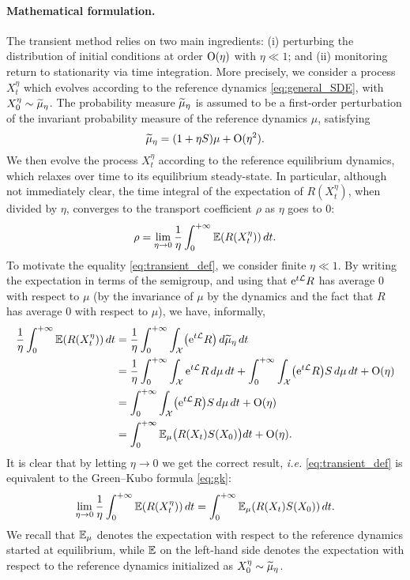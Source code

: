 \paragraph{Mathematical formulation.} The transient method relies on two main ingredients: (i) perturbing the distribution of initial conditions at order $\mathrm{O}(\eta)$ with $\eta\ll 1$; and (ii) monitoring return to stationarity via time integration. More precisely, we consider a process $X_t^\eta$ which evolves according to the reference dynamics \eqref{eq:general_SDE}, with $X_0^\eta \sim \widetilde{\mu}_\eta$. The probability measure $\widetilde{\mu}_\eta$ is assumed to be a first-order perturbation of the invariant probability measure of the reference dynamics $\mu$, satisfying
%
\begin{equation}
	\widetilde{\mu}_\eta = (1+\eta S)\mu + \mathrm{O}(\eta^2).
	\label{eq:init_dist}
\end{equation}
%
We then evolve the process $X_t^\eta$ according to the reference equilibrium dynamics, which relaxes over time to its equilibrium steady-state. In particular, although not immediately clear, the time integral of the expectation of $R(X_t^\eta)$, when divided by $\eta$, converges to the transport coefficient $\rho$ as $\eta$ goes to 0:
%
\begin{equation}
	\rho = \lim_{\eta\to 0} \frac{1}{\eta}\int_0^{+\infty} \mathbb{E}(R(X_t^\eta)) \, dt.
	\label{eq:transient_def}
\end{equation}
%
To motivate the equality \eqref{eq:transient_def}, we consider finite $\eta\ll 1$. By writing the expectation in terms of the semigroup, and using that $\mathrm{e}^{t\mathcal{L}}R$ has average 0 with respect to $\mu$ (by the invariance of $\mu$ by the dynamics and the fact that $R$ has average 0 with respect to $\mu$), we have, informally,
%
%
\begin{align}
    \label{eq:gk_equiv1}
	\frac{1}{\eta}\int_0^{+\infty} \mathbb{E}(R(X_t^\eta)) \, dt &= \frac{1}{\eta} \int_0^{+\infty} \int_\mathcal{X} \bigl(\mathrm{e}^{t\mathcal{L}} R\bigr) \, d\widetilde{\mu}_\eta \, dt \\
	&= \frac{1}{\eta}\int_0^{+\infty} \int_\mathcal{X} \mathrm{e}^{t\mathcal{L}} R \, d\mu \, dt + \int_0^{+\infty} \int_\mathcal{X} \bigl(\mathrm{e}^{t\mathcal{L}} R\bigr) S \, d\mu \, dt + \mathrm{O}(\eta) \\
	&= \int_0^{+\infty} \int_\mathcal{X} \bigl(\mathrm{e}^{t\mathcal{L}} R\bigr) S \, d\mu \, dt + \mathrm{O}(\eta) \\
	&= \int_0^{+\infty} \mathbb{E}_\mu\bigl(R(X_t)S(X_0)\bigr) dt + \mathrm{O}(\eta).
    \label{eq:gk_equiv2}
\end{align}
%
It is clear that by letting $\eta\to 0$ we get the correct result, \emph{i.e.} \eqref{eq:transient_def} is equivalent to the Green--Kubo formula \eqref{eq:gk}:
%
\begin{equation}
	\lim_{\eta\to 0}\frac{1}{\eta}\int_0^{+\infty} \mathbb{E}(R(X_t^\eta)) \, dt = \int_0^{+\infty} \mathbb{E}_\mu(R(X_t) S(X_0)) \, dt.
	\label{eq:td_gk}
\end{equation}
%
We recall that $\mathbb{E}_\mu$ denotes the expectation with respect to the reference dynamics started at equilibrium, while $\mathbb{E}$ on the left-hand side denotes the expectation with respect to the reference dynamics initialized as $X_0^\eta \sim \widetilde{\mu}_\eta$.

